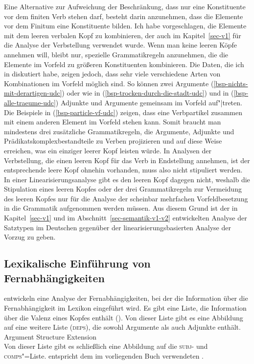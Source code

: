 \noindent
Eine Alternative zur Aufweichung der Beschränkung, dass nur eine Konstituente vor dem finiten
Verb stehen darf, besteht darin anzunehmen, dass die Elemente vor dem Finitum eine Konstituente
bilden. Ich habe vorgeschlagen, die Elemente mit dem leeren verbalen Kopf zu kombinieren, der
auch im Kapitel~\ref{sec-v1} für die Analyse der Verbstellung verwendet wurde. Wenn man keine
leeren Köpfe annehmen will, bleibt nur, spezielle Grammatikregeln anzunehmen, die die Elemente
im Vorfeld zu größeren Konstituenten kombinieren. Die Daten, die ich in 
diskutiert habe, zeigen jedoch, dass sehr viele verschiedene Arten von Kombinationen
im Vorfeld möglich sind. So können zwei Argumente (\ref{bsp-nichts-mit-derartigen-udc}) oder wie in
(\ref{bsp-trocken-durch-die-stadt-udc}) und in (\ref{bsp-alle-traeume-udc}) Adjunkte und Argumente
gemeinsam im Vorfeld auf"|treten. Die Beispiele in (\ref{bsp-particle-vf-udc}) zeigen, dass eine
Verbpartikel zusammen mit einem anderen Element im Vorfeld stehen kann. Somit braucht man mindestens
drei zusätzliche Grammatikregeln, die Argumente, Adjunkte und Prädikatskomplexbestandteile zu Verben projizieren und auf diese
Weise erreichen, was ein einziger leerer Kopf leisten würde. In Analysen der Verbstellung,
die einen leeren Kopf für das Verb in Endstellung annehmen, ist der entsprechende leere Kopf
ohnehin vorhanden, muss also nicht stipuliert werden. In einer Linearisierungsanalyse gibt es
den leeren Kopf dagegen nicht, weshalb die Stipulation eines leeren Kopfes oder der drei Grammatikregeln
zur Vermeidung des leeren Kopfes nur für die Analyse der scheinbar mehrfachen Vorfeldbesetzung
in die Grammatik aufgenommen werden müssen. Aus diesem Grund ist der in Kapitel~\ref{sec-v1}
und im Abschnitt~\ref{sec-semantik-v1-v2} entwickelten Analyse der Satztypen im Deutschen
gegenüber der linearisierungsbasierten Analyse der Vorzug zu geben.%


\subsection{Lexikalische Einführung von Fernabhängigkeiten}
\label{sec-lex-intro-udc}\label{Abschnitt-Argumentrealisierungsprinzip-BMS}

\mbox{}\citet*{BMS2001a} entwickeln eine Analyse der Fernabhängigkeiten, bei der
die Information über die Fernabhängigkeit im Lexikon eingeführt wird. Es gibt
eine Liste, die Information über die Valenz eines Kopfes enthält (\argst).
Von dieser Liste gibt es eine Abbildung auf eine weitere Liste (\textsc{deps}),
die sowohl Argumente als auch Adjunkte enthält. 
\ea
Argument Structure Extension \citep*[]{BMS2001a}\\
 \impl {}
\z
Von dieser Liste gibt es schließlich eine Abbildung auf die \textsc{subj}- und
\textsc{comps}"=Liste. \subj entspricht dem im vorliegenden Buch verwendeten \sprm.

